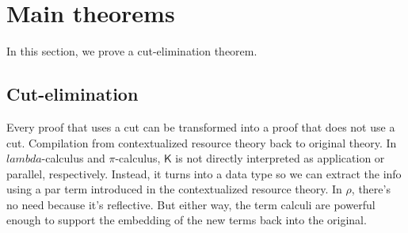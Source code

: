 \documentclass{llncs}
\renewcommand{\:}{\colon}
\newcommand{\pic}{$\pi$-calculus}
\begin{document}









\section{Main theorems}
In this section, we prove a cut-elimination theorem.
\subsection{Cut-elimination}
Every proof that uses a cut can be transformed into a proof that does
not use a cut.  Compilation from contextualized resource theory back
to original theory. In $lambda$-calculus and {\pic}, $\mathsf{K}$ is
not directly interpreted as application or parallel,
respectively. Instead, it turns into a data type so we can extract the
info using a par term introduced in the contextualized resource
theory.  In $\rho$, there's no need because it's reflective.  But either
way, the term calculi are powerful enough to support the embedding of
the new terms back into the original.
\end{document}
